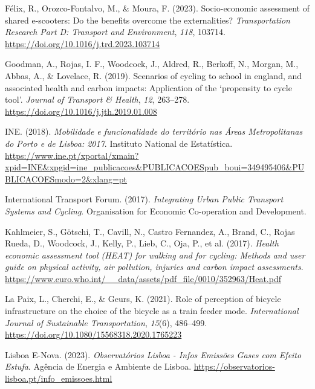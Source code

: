 \documentclass[review, doubleblind, 3p,
authoryear]{elsarticle} %
\newlength{\cslhangindent}
\newlength{\cslentryspacingunit} %
\newenvironment{CSLReferences}[2] %
 {%
  \setlength{\parindent}{0pt}
  \ifodd #1
  \let\oldpar\par
  \def\par{\hangindent=\cslhangindent\oldpar}
  \fi
  \setlength{\parskip}{#2\cslentryspacingunit}
 }%
 {}
\begin{document}
\begin{CSLReferences}{1}{0}
\leavevmode{}%
Félix, R., Orozco-Fontalvo, M., \& Moura, F. (2023). Socio-economic
assessment of shared e-scooters: Do the benefits overcome the
externalities? \emph{Transportation Research Part D: Transport and
Environment}, \emph{118}, 103714.
\url{https://doi.org/10.1016/j.trd.2023.103714}

\leavevmode{}%
Goodman, A., Rojas, I. F., Woodcock, J., Aldred, R., Berkoff, N.,
Morgan, M., Abbas, A., \& Lovelace, R. (2019). Scenarios of cycling to
school in england, and associated health and carbon impacts: Application
of the {`}propensity to cycle tool{'}. \emph{Journal of Transport \&
Health}, \emph{12}, 263--278.
\url{https://doi.org/10.1016/j.jth.2019.01.008}

\leavevmode{}%
INE. (2018). \emph{Mobilidade e funcionalidade do território nas {Áreas
Metropolitanas do Porto e de Lisboa}: 2017}. {Instituto National de
Estatística}.
\url{https://www.ine.pt/xportal/xmain?xpid=INE\&xpgid=ine_publicacoes\&PUBLICACOESpub_boui=349495406\&PUBLICACOESmodo=2\&xlang=pt}

\leavevmode{}%
International Transport Forum. (2017). \emph{Integrating {Urban Public
Transport Systems} and {Cycling}}. {Organisation for Economic
Co-operation and Development}.

\leavevmode{}%
Kahlmeier, S., Götschi, T., Cavill, N., Castro Fernandez, A., Brand, C.,
Rojas Rueda, D., Woodcock, J., Kelly, P., Lieb, C., Oja, P., et al.
(2017). \emph{Health economic assessment tool ({HEAT}) for walking and
for cycling: Methods and user guide on physical activity, air pollution,
injuries and carbon impact assessments}.
\url{https://www.euro.who.int/__data/assets/pdf_file/0010/352963/Heat.pdf}

\leavevmode{}%
La Paix, L., Cherchi, E., \& Geurs, K. (2021). Role of perception of
bicycle infrastructure on the choice of the bicycle as a train feeder
mode. \emph{International Journal of Sustainable Transportation},
\emph{15}(6), 486--499.
\url{https://doi.org/10.1080/15568318.2020.1765223}

\leavevmode{}%
Lisboa E-Nova. (2023). \emph{{Observatórios Lisboa - Infos Emissões
Gases com Efeito Estufa}}. {Agência de Energia e Ambiente de Lisboa}.
\url{https://observatorios-lisboa.pt/info_emissoes.html}


\end{CSLReferences}
\end{document}
